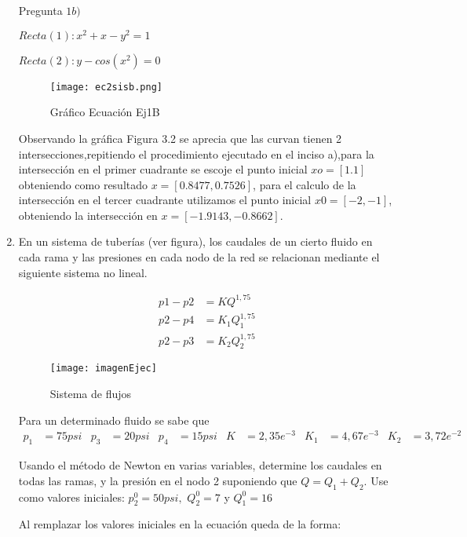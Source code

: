 \documentclass{udpreport}
\begin{document}
\begin{enumerate}
        Pregunta $ 1b)$
        
            $ Recta(1) : x^2 + x -y^2=1 $
            
            $ Recta(2) : y-cos(x^2)=0  $
            \begin{figure}[h]
                \centering
                \texttt{[image: ec2sisb.png]}
                 \caption{Gráfico Ecuación Ej1B}
            \end{figure}
            
         Observando la gráfica Figura 3.2 se aprecia que las curvan tienen 2 intersecciones,repitiendo el procedimiento ejecutado en el inciso a),para la intersección en el primer cuadrante se escoje el punto inicial $xo=[1.1] $ obteniendo como resultado $x=[0.8477,0.7526]$, para el calculo de la intersección en el tercer cuadrante utilizamos el punto inicial $x0=[-2,-1]$, obteniendo la intersección en $x=[-1.9143,-0.8662]$.
            
    
        \newpage
        
        \item En un sistema de tuberías (ver figura), los caudales de un cierto fluido en cada rama y las presiones en cada nodo de la red se relacionan mediante el siguiente sistema no lineal.
        
        \begin{align*} 
            p1 - p2 &= KQ^{1,75} \\ 
            p2 - p4 &= K_1 Q_1^{1,75}\\
            p2 - p3 &= K_2 Q_2^{1,75}
        \end{align*}
        
    \begin{figure}[H]
    \centering
    \texttt{[image: imagenEjec]}
    \caption{Sistema de flujos}
    \end{figure}        
    
    Para un determinado fluido se sabe que
    \begin{align*}
    p_1&=75psi & p_3&=20psi &  p_4&=15psi & K&=2,35e^{-3} & K_1&=4,67e^{-3} & K_2&=3,72e^{-2}
    \end{align*}
    
    Usando el método de Newton en varias variables, determine los caudales en todas las ramas, y la presión en el nodo 2 suponiendo que $Q = Q_1 + Q_2 $. Use como valores iniciales: $ p_2^0= 50 psi,$  $Q_2^0=7$ y  $Q_1^0=16$
    
    
    Al remplazar los valores iniciales en la ecuación queda de la forma:
    

\end{enumerate}
\end{document}
